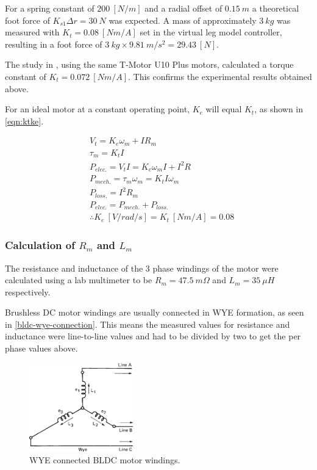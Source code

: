 For a spring constant of $200\ [N/m]$ and a radial offset of $0.15\ m$ a theoretical foot force of $K_{s1}\Delta r = 30\ N$ was expected. A mass of approximately $3\ kg$ was measured with $K_t = 0.08\ [Nm/A]$ set in the virtual leg model controller, resulting in a foot force of $3\ kg \times 9.81\ m/s^2 = 29.43\ [N]$. 

The study in \cite{Kalouche2016}, using the same T-Motor U10 Plus motors, calculated a torque constant of $K_t =  0.072\ [Nm/A]$. This confirms the experimental results obtained above.

For an ideal motor at a constant operating point, $K_e$ will equal $K_t$, as shown in \cref{eqn:ktke}.

\begin{equation} \label{eqn:ktke}
\begin{aligned}
&V_t = K_e\omega_m + IR_m \\
&\tau_m = K_t I \\
&P_{elec.} = V_t I = K_e \omega_m I + I^2 R \\ 
&P_{mech.} = \tau_m \omega_m = K_t I \omega_m \\
&P_{loss.} = I^2 R_m \\
&P_{elec.} = P_{mech.} + P_{loss.} \\
&\therefore K_e\ [V/rad/s]= K_t\ [Nm/A] = 0.08
\end{aligned} 
\end{equation}

\subsubsection{Calculation of $R_m$ and $L_m$}
The resistance and inductance of the 3 phase windings of the motor were calculated using a lab multimeter to be $R_m = 47.5\ m\Omega$ and $L_m = 35\ \mu H$ respectively. 

Brushless DC motor windings are usually connected in WYE formation, as seen in \cref{bldc-wye-connection}. This means the measured values for resistance and inductance were line-to-line values and had to be divided by two to get the per phase values above.

\begin{figure}
\centering
\includegraphics[width=0.4\textwidth]{images/motor/wye.jpg} 
\caption{WYE connected BLDC motor windings.}
\label{fig:bldc-wye-connection}
\end{figure}

